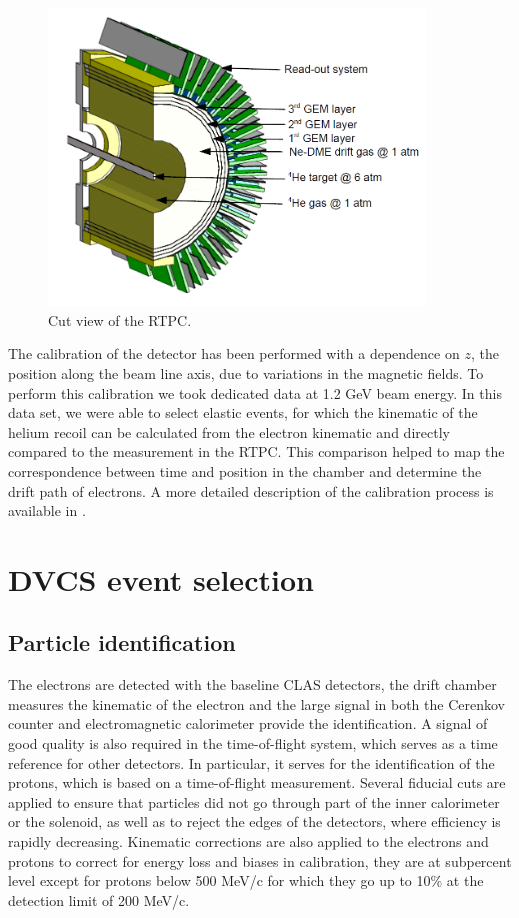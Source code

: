 \documentclass[aps,prc,preprint,superscriptaddress]{revtex4}
\begin{document}
\begin{figure}[tbp!]
\center
\includegraphics[width=10cm]{fig3/RTPC_new_1.png}
\caption{Cut view of the RTPC.}
\label{fig:RTPCGlobal}
\end{figure}

The calibration of the detector has been performed with a 
dependence on $z$, the position along the beam line axis, due to 
variations in the magnetic fields. To perform this calibration we took  
dedicated data at 1.2 GeV beam energy. In 
this data set, we were able to select elastic events, for which the kinematic 
of the helium recoil can be calculated from the electron kinematic and 
directly compared to the measurement in the RTPC. This comparison helped to 
map the correspondence between time and position in the chamber and determine 
the drift path of electrons. A more detailed description of the calibration process 
is available in \cite{Dupre:2017upj}.

\section{DVCS event selection}

\subsection{Particle identification}

The electrons are detected with the baseline CLAS detectors, the drift chamber measures the kinematic 
of the electron and the large signal in both the Cerenkov counter and electromagnetic calorimeter
provide the identification. A signal of good quality is also required in the 
time-of-flight system, which serves as a time reference for other detectors. In particular, it 
serves for the identification of the protons, which is based on a 
time-of-flight measurement. Several 
fiducial cuts are applied to ensure that particles did not go through part of the inner calorimeter 
or the solenoid, as well as to reject the edges of the detectors, where efficiency is rapidly 
decreasing. Kinematic corrections are also applied to the electrons and protons to correct for energy loss
and biases in calibration, they are at subpercent level except for protons below 500 MeV/c for which they
go up to 10\% at the detection limit of 200 MeV/c.
\end{document}
